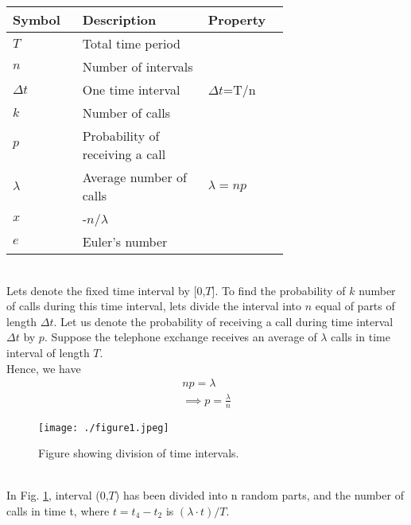 \documentclass[journal,12pt,twocolumn]{IEEEtran}
\begin{document}
\begin{table}[h!]
\centering
    \begin{tabular}{|p{0.15\linewidth}|p{0.37\linewidth}|p{0.17\linewidth}|}
    \hline
    \textbf{Symbol} & \textbf{Description} & \textbf{Property}\\[0.5ex]
    \hline
    $T$ & Total time period & \\
    \hline
    $n$ & Number of intervals & \\
    \hline
    $\Delta t$ & One time interval & $\Delta t$=T/n\\
    \hline
    $k$ & Number of calls &\\
    \hline
    $p$ & Probability of receiving a call &\\
    \hline
    $\lambda$ & Average number of calls & $\lambda=np$\\
    \hline
    $x$ & -$n$/$\lambda$ &\\
    \hline
    $e$ & Euler's number &\\
    \hline
    \end{tabular}
\end{table}\\
Lets denote the fixed time interval by [0,$T$].
To find the probability of $k$ number of calls during this time interval, lets divide the interval into $n$ equal of parts of length $\Delta t$.
Let us denote the probability of receiving a call during time interval $\Delta t$ by $p$. Suppose the telephone exchange receives an average of $\lambda$ calls in time interval of length $T$.\\
Hence, we have
\begin{align}
    np=\lambda\\
    \implies p=\frac{\lambda}{n}
\end{align}
\begin{figure}[!hbt]
    \centering
	\texttt{[image: ./figure1.jpeg]}
    \caption{Figure showing division of time intervals.}
    \label{fig_0}
\end{figure}\\
In Fig. \ref{fig_0}, interval (0,$T$) has been divided into n random parts, and the number of calls in time t, where $t=t_4-t_2$ is $(\lambda\cdot t)/T$.\\
\end{document}
